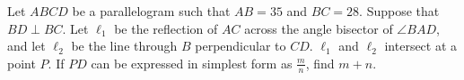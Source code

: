 Let $ABCD$ be a parallelogram such that $AB = 35$ and $BC = 28$. Suppose that $BD \perp BC$. Let $\ell_1$ be the reflection of $AC$ across the angle bisector of $\angle BAD$,  and let $\ell_2$ be the line through $B$ perpendicular to $CD$. $\ell_1$ and $\ell_2$ intersect at a point $P$. If $PD$ can be expressed in simplest form as $\frac{m}{n}$,  find $m + n$.